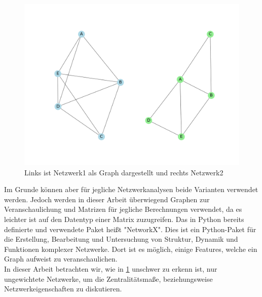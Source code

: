 \begin{figure}[h!]
    \centering
    \hspace*{-4cm}
    \includegraphics[width=1.0\textwidth]{Graphics/MatrixInNetwork.png}
    \caption{Links ist Netzwerk1 als Graph dargestellt und rechts Netzwerk2}\label{fig:MatrixInNetzwerk}
\end{figure}

Im Grunde können aber für jegliche Netzwerkanalysen beide Varianten verwendet werden. Jedoch werden in dieser Arbeit überwiegend Graphen zur Veranschaulichung und Matrizen für jegliche Berechnungen verwendet, da es leichter ist auf den Datentyp einer Matrix zuzugreifen. Das in Python bereits definierte und verwendete Paket heißt "NetworkX". Dies ist ein Python-Paket für die Erstellung, Bearbeitung und Untersuchung von Struktur, Dynamik und Funktionen komplexer Netzwerke. Dort ist es möglich, einige Features, welche ein Graph aufweist zu veranschaulichen. \\
In dieser Arbeit betrachten wir, wie in \ref{fig:MatrixInNetzwerk} unschwer zu erkenn ist, nur
ungewichtete Netzwerke, um die Zentralitätsmaße, beziehungsweise Netzwerkeigenschaften zu diskutieren.

